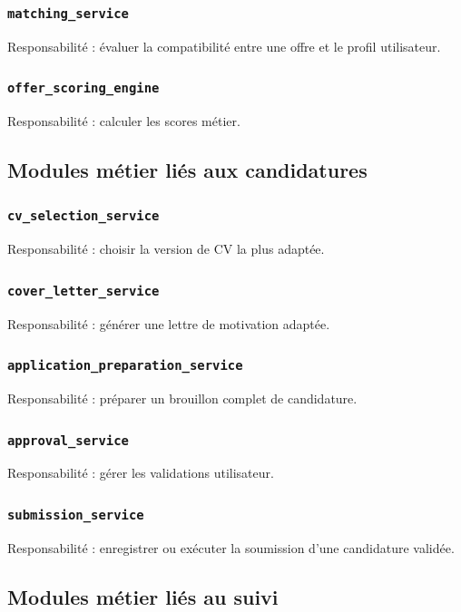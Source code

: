 \documentclass[11pt,a4paper]{article}
\begin{document}
\subsubsection{\texttt{matching\_service}}
Responsabilité : évaluer la compatibilité entre une offre et le profil utilisateur.

\subsubsection{\texttt{offer\_scoring\_engine}}
Responsabilité : calculer les scores métier.

\subsection{Modules métier liés aux candidatures}

\subsubsection{\texttt{cv\_selection\_service}}
Responsabilité : choisir la version de CV la plus adaptée.

\subsubsection{\texttt{cover\_letter\_service}}
Responsabilité : générer une lettre de motivation adaptée.

\subsubsection{\texttt{application\_preparation\_service}}
Responsabilité : préparer un brouillon complet de candidature.

\subsubsection{\texttt{approval\_service}}
Responsabilité : gérer les validations utilisateur.

\subsubsection{\texttt{submission\_service}}
Responsabilité : enregistrer ou exécuter la soumission d’une candidature validée.

\subsection{Modules métier liés au suivi}
\end{document}
